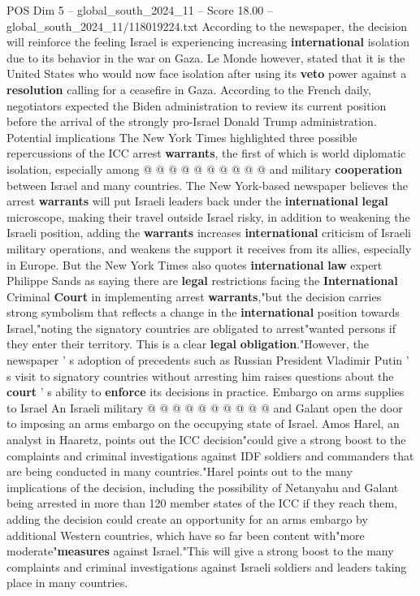 \begin{textsample}{POS Dim 5 – global\_south\_2024\_11 – Score 18.00 – global\_south\_2024\_11/118019224.txt}
According to the newspaper, the decision will reinforce the feeling Israel is experiencing increasing \textbf{international} isolation due to its behavior in the war on Gaza.
Le Monde however, stated that it is the United States who would now face isolation after using its \textbf{veto} power against a \textbf{resolution} calling for a ceasefire in Gaza.
According to the French daily, negotiators expected the Biden administration to review its current position before the arrival of the strongly pro-Israel Donald Trump administration.
Potential implications The New York Times highlighted three possible repercussions of the ICC arrest \textbf{warrants}, the first of which is world diplomatic isolation, especially among @ @ @ @ @ @ @ @ @ @ and military \textbf{cooperation} between Israel and many countries.
The New York-based newspaper believes the arrest \textbf{warrants} will put Israeli leaders back under the \textbf{international} \textbf{legal} microscope, making their travel outside Israel risky, in addition to weakening the Israeli position, adding the \textbf{warrants} increases \textbf{international} criticism of Israeli military operations, and weakens the support it receives from its allies, especially in Europe.
But the New York Times also quotes \textbf{international} \textbf{law} expert Philippe Sands as saying there are \textbf{legal} restrictions facing the \textbf{International} Criminal \textbf{Court} in implementing arrest \textbf{warrants},"but the decision carries strong symbolism that reflects a change in the \textbf{international} position towards Israel,"noting the signatory countries are obligated to arrest"wanted persons if they enter their territory.
This is a clear \textbf{legal} \textbf{obligation}."However, the newspaper ' s adoption of precedents such as Russian President Vladimir Putin ' s visit to signatory countries without arresting him raises questions about the \textbf{court} ' s ability to \textbf{enforce} its decisions in practice.
Embargo on arms supplies to Israel An Israeli military @ @ @ @ @ @ @ @ @ @ and Galant open the door to imposing an arms embargo on the occupying state of Israel.
Amos Harel, an analyst in Haaretz, points out the ICC decision"could give a strong boost to the complaints and criminal investigations against IDF soldiers and commanders that are being conducted in many countries."Harel points out to the many implications of the decision, including the possibility of Netanyahu and Galant being arrested in more than 120 member states of the ICC if they reach them, adding the decision could create an opportunity for an arms embargo by additional Western countries, which have so far been content with"more moderate"\textbf{measures} against Israel."This will give a strong boost to the many complaints and criminal investigations against Israeli soldiers and leaders taking place in many countries.

\end{textsample}

